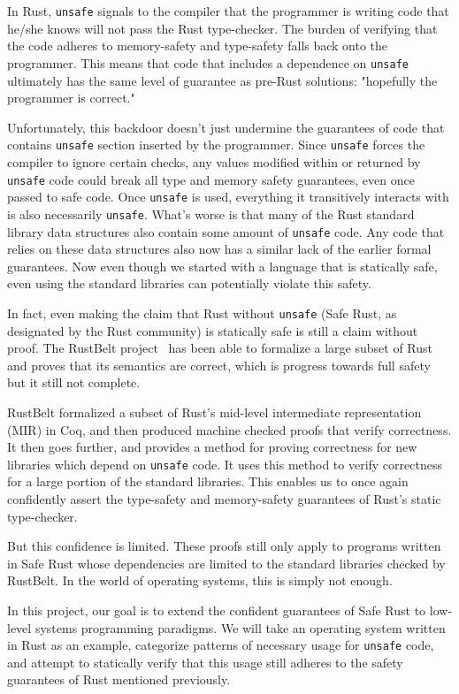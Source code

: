 \documentclass[12pt]{article}
\begin{document}
In Rust, \texttt{unsafe} signals to the compiler that the programmer is writing code that he/she knows will not pass the Rust type-checker. The burden of verifying that the code adheres to memory-safety and type-safety falls back onto the programmer. This means that code that includes a dependence on \texttt{unsafe} ultimately has the same level of guarantee as pre-Rust solutions: "hopefully the programmer is correct."

Unfortunately, this backdoor doesn't just undermine the guarantees of code that contains \texttt{unsafe} section inserted by the programmer. Since \texttt{unsafe} forces the compiler to ignore certain checks, any values modified within or returned by \texttt{unsafe} code could break all type and memory safety guarantees, even once passed to safe code. Once \texttt{unsafe} is used, everything it transitively interacts with is also necessarily \texttt{unsafe}. What's worse is that many of the Rust standard library data structures also contain some amount of \texttt{unsafe} code. Any code that relies on these data structures also now has a similar lack of the earlier formal guarantees. Now even though we started with a language that is statically safe, even using the standard libraries can potentially violate this safety.

In fact, even making the claim that Rust without \texttt{unsafe} (Safe Rust, as designated by the Rust community) is statically safe is still a claim without proof. The RustBelt project~\cite{rustbelt} has been able to formalize a large subset of Rust and proves that its semantics are correct, which is progress towards full safety but it still not complete. 

RustBelt formalized a subset of Rust's mid-level intermediate representation (MIR) in Coq, and then produced machine checked proofs that verify correctness. It then goes further, and provides a method for proving correctness for new libraries which depend on \texttt{unsafe} code. It uses this method to verify correctness for a large portion of the standard libraries. This enables us to once again confidently assert the type-safety and memory-safety guarantees of Rust's static type-checker.

But this confidence is limited. These proofs still only apply to programs written in Safe Rust whose dependencies are limited to the standard libraries checked by RustBelt. In the world of operating systems, this is simply not enough. %

In this project, our goal is to extend the confident guarantees of Safe Rust to low-level systems programming paradigms. We will take an operating system written in Rust as an example, categorize patterns of necessary usage for \texttt{unsafe} code, and attempt to statically verify that this usage still adheres to the safety guarantees of Rust mentioned previously. 
\end{document}
